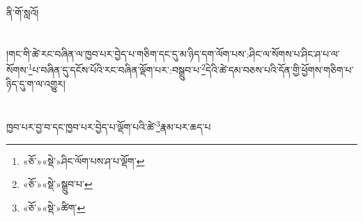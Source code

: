 ནི་གོ་སླའོ།\chapter{ }།གང་གི་ཚེ་རང་བཞིན་ལ་ཁྱབ་པར་བྱེད་པ་གཅིག་དང་དུ་མ་ཉིད་དག་ལོག་པས་:ཤིང་ལ་སོགས་པ་ཤིང་ཤ་པ་ལ་སོགས་\footnote{«ཅོ་»«སྡེ་»ཤིང་ལོག་པས་ཤ་པ་ལྡོག་}པ་བཞིན་དུ་དངོས་པོའི་རང་བཞིན་ལྡོག་པར་:བསྒྲུབ་པ་\footnote{«ཅོ་»«སྡེ་»སྒྲུབ་པ་}དེའི་ཚེ་དམ་བཅས་པའི་དོན་གྱི་ཕྱོགས་གཅིག་པ་ཉིད་དུ་ག་ལ་འགྱུར།\chapter{ }ཁྱབ་པར་བྱ་བ་དང་ཁྱབ་པར་བྱེད་པ་ལྡོག་པའི་ཚེ་\footnote{«ཅོ་»«སྡེ་»ཚིག་}རྣམ་པར་ཆད་པ